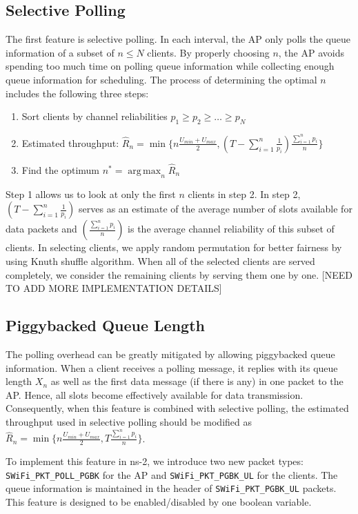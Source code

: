 \documentclass{article}
\DeclareMathOperator*{\argmax}{arg\,max}
\begin{document}
\subsection{Selective Polling}
The first feature is selective polling. In each interval, the AP only polls the queue information of a subset of $n \le N $ clients. By properly choosing $n$, the AP avoids spending too much time on polling queue information while collecting enough queue information for scheduling. The process of determining the optimal $n$ includes the following three steps:
\begin{enumerate}
\item Sort clients by channel reliabilities $p_1 \geq p_2 \geq \dots \geq p_N$
\item Estimated throughput: $\hat{R}_n = \min\{n\frac{U_{min}+U_{max}}{2}, (T-\sum_{i=1}^{n}\frac{1}{p_i})\frac{\sum_{i=1}^{n}p_i}{n} \}$
\item Find the optimum $n^* = \argmax_{n} \hat{R}_n$
\end{enumerate}
Step 1 allows us to look at only the first $n$ clients in step 2. In step 2, $(T-\sum_{i=1}^{n}\frac{1}{p_i})$ serves as an estimate of the average number of slots available for data packets and $(\frac{\sum_{i=1}^{n}p_i}{n})$ is the average channel reliability of this subset of clients.
In selecting clients, we apply random permutation for better fairness by using Knuth shuffle algorithm. When all of the selected clients are served completely, we consider the  remaining clients by serving them one by one.
[NEED TO ADD MORE IMPLEMENTATION DETAILS]

\subsection{Piggybacked Queue Length}

The polling overhead can be greatly mitigated by allowing piggybacked queue information. When a client receives a polling message, it replies with its queue length $X_n$ as well as the first data message (if there is any) in one packet to the AP. Hence, all slots become effectively available for data transmission. Consequently, when this feature is combined with selective polling, the estimated throughput used in selective polling should be modified as $\hat{R}_n = \min \{n\frac{U_{min}+U_{max}}{2}, T \frac{\sum_{i=1}^{n}p_i}{n} \}$. 

To implement this feature in ns-2, we introduce two new packet types: \lstinline|SWiFi_PKT_POLL_PGBK| for the AP and \lstinline|SWiFi_PKT_PGBK_UL| for the clients. The queue information is maintained in the header of \lstinline|SWiFi_PKT_PGBK_UL| packets. This feature is designed to be enabled/disabled by one boolean variable.
\end{document}
